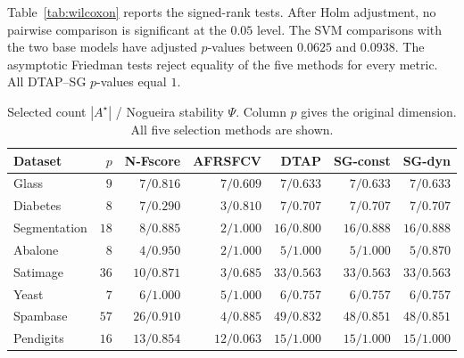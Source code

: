 \documentclass[]{interact}
\theoremstyle{plain}
\theoremstyle{definition}
\theoremstyle{remark}
\begin{document}
Table~\ref{tab:wilcoxon} reports the signed-rank tests. After Holm adjustment, no pairwise comparison is significant at the $0.05$ level. The SVM comparisons with the two base models have adjusted $p$-values between $0.0625$ and $0.0938$. The asymptotic Friedman tests reject equality of the five methods for every metric. All DTAP--SG $p$-values equal $1$.

\begin{table}[htbp]
\centering\small\setlength{\tabcolsep}{4pt}
\caption{Selected count $|A^\star|$ / Nogueira stability $\Psi$. Column $p$ gives the original dimension. All five selection methods are shown.}\label{tab:nfeat}
\begin{tabular}{lrrrrrr}
\toprule
Dataset & $p$ & N-Fscore & AFRSFCV & DTAP & SG-const & SG-dyn \\
\midrule
Glass & $9$ & $7/0.816$ & $7/0.609$ & $7/0.633$ & $7/0.633$ & $7/0.633$ \\
Diabetes & $8$ & $7/0.290$ & $3/0.810$ & $7/0.707$ & $7/0.707$ & $7/0.707$ \\
Segmentation & $18$ & $8/0.885$ & $2/1.000$ & $16/0.800$ & $16/0.888$ & $16/0.888$ \\
Abalone & $8$ & $4/0.950$ & $2/1.000$ & $5/1.000$ & $5/1.000$ & $5/0.870$ \\
Satimage & $36$ & $10/0.871$ & $3/0.685$ & $33/0.563$ & $33/0.563$ & $33/0.563$ \\
Yeast & $7$ & $6/1.000$ & $5/1.000$ & $6/0.757$ & $6/0.757$ & $6/0.757$ \\
Spambase & $57$ & $26/0.910$ & $4/0.885$ & $49/0.832$ & $48/0.851$ & $48/0.851$ \\
Pendigits & $16$ & $13/0.854$ & $12/0.063$ & $15/1.000$ & $15/1.000$ & $15/1.000$ \\
\bottomrule
\end{tabular}

\end{table}
\end{document}

